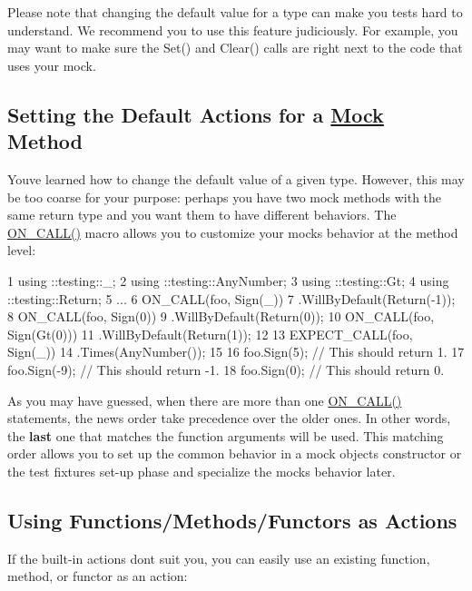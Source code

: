 Please note that changing the default value for a type can make you tests hard to understand. We recommend you to use this feature judiciously. For example, you may want to make sure the {\ttfamily Set()} and {\ttfamily Clear()} calls are right next to the code that uses your mock.

\subsection*{Setting the Default Actions for a \hyperlink{classMock}{Mock} Method}

You\textquotesingle{}ve learned how to change the default value of a given type. However, this may be too coarse for your purpose\+: perhaps you have two mock methods with the same return type and you want them to have different behaviors. The {\ttfamily \hyperlink{gmock-spec-builders_8h_a5b12ae6cf84f0a544ca811b380c37334}{O\+N\+\_\+\+C\+A\+L\+L()}} macro allows you to customize your mock\textquotesingle{}s behavior at the method level\+:


\begin{DoxyCode}
1 using ::testing::\_;
2 using ::testing::AnyNumber;
3 using ::testing::Gt;
4 using ::testing::Return;
5 ...
6   ON\_CALL(foo, Sign(\_))
7       .WillByDefault(Return(-1));
8   ON\_CALL(foo, Sign(0))
9       .WillByDefault(Return(0));
10   ON\_CALL(foo, Sign(Gt(0)))
11       .WillByDefault(Return(1));
12 
13   EXPECT\_CALL(foo, Sign(\_))
14       .Times(AnyNumber());
15 
16   foo.Sign(5);   // This should return 1.
17   foo.Sign(-9);  // This should return -1.
18   foo.Sign(0);   // This should return 0.
\end{DoxyCode}


As you may have guessed, when there are more than one {\ttfamily \hyperlink{gmock-spec-builders_8h_a5b12ae6cf84f0a544ca811b380c37334}{O\+N\+\_\+\+C\+A\+L\+L()}} statements, the news order take precedence over the older ones. In other words, the {\bfseries last} one that matches the function arguments will be used. This matching order allows you to set up the common behavior in a mock object\textquotesingle{}s constructor or the test fixture\textquotesingle{}s set-\/up phase and specialize the mock\textquotesingle{}s behavior later.

\subsection*{Using Functions/\+Methods/\+Functors as Actions}

If the built-\/in actions don\textquotesingle{}t suit you, you can easily use an existing function, method, or functor as an action\+:



